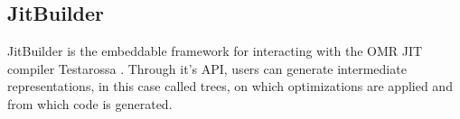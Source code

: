 \subsection{JitBuilder}
JitBuilder is the embeddable framework for interacting with the OMR JIT compiler Testarossa \cite{jitbuilderPaper}.
Through it's API, users can generate intermediate representations, in this case called trees, on which optimizations are applied and from which code is generated.

